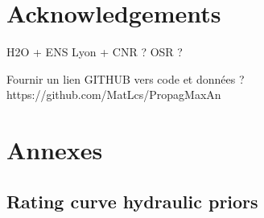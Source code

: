 \documentclass[11pt]{article}
\begin{document}
\section{Acknowledgements}

H2O + ENS Lyon + CNR ?
OSR ? 

Fournir un lien GITHUB vers code et données ? 
https://github.com/MatLcs/PropagMaxAn 

\newpage
\printbibliography
\section{Annexes}

    \subsection{Rating curve hydraulic priors}
        
\end{document}
